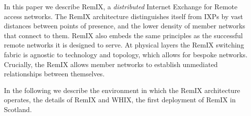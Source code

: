 In this paper we describe RemIX, a \emph{distributed} Internet Exchange for
Remote access networks. The RemIX architecture distinguishes itself
from \acp{IXP} 
 by vast distances between points of presence, and the lower density
of member networks that connect to them. RemIX also embeds the same
principles as the successful remote networks it is designed to serve.
At physical layers the RemIX switching fabric is agnostic to technology and
topology, which allows for bespoke networks. Crucially, the RemIX
allows member networks to establish unmediated relationships between
themselves.

In the following we describe the environment in which the  RemIX architecture operates, the details of RemIX and   WHIX, the first deployment of RemIX  in Scotland.
